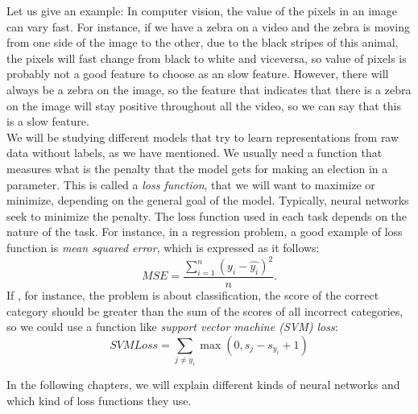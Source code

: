 Let us give an example: In computer vision, the value of the pixels in an image can vary fast. For instance, if we have a zebra on a video and the zebra is moving from one side of the image to the other, due 
to the black stripes of this animal, the pixels will fast change from black to white and viceversa, so value of pixels is probably not a good feature to choose as an slow feature. However, there will always
be a zebra on the image, so the feature that indicates that there is a zebra on the image will stay positive throughout all the video, so we can say that this is a slow feature.\\

We will be studying different models that try to learn representations from raw data without labels, as we have mentioned. We usually need a function that measures what is the penalty that the model gets for making an election in a parameter.
This is called a \emph{loss function}, that we will want to maximize or minimize, depending on the general goal of the model. Typically, neural networks seek to minimize the penalty. The loss function used in each task depends on the nature of the task.
For instance, in a regression problem, a good example of loss function is \emph{mean squared error}, which is expressed as it follows:
\[
MSE = \frac{\sum_{i =1 }^n \left(y_i - \hat{y_i}\right)^2}{n}.
\]
If , for instance, the problem is about classification, the score of the correct category should be greater than the sum of the scores of all incorrect categories, so we could use a function like \emph{support vector machine (SVM) loss}:
\[
SVMLoss = \sum_{j \neq y_i} \max(0,s_j - s_{y_i} + 1)
\]



In the following chapters, we will explain different kinds of neural networks and which kind of loss functions they use. 


